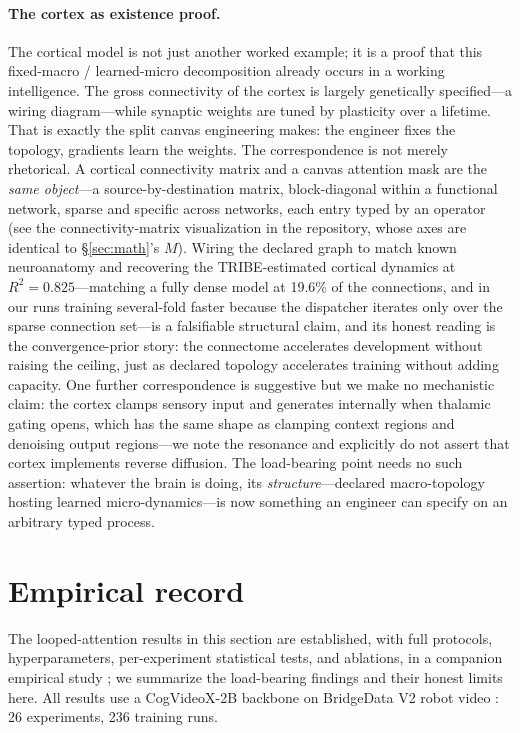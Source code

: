 \documentclass[10pt,twocolumn]{article}
\begin{document}
\paragraph{The cortex as existence proof.}
The cortical model is not just another worked example; it is a proof that this fixed-macro / learned-micro decomposition already occurs in a working intelligence. The gross connectivity of the cortex is largely genetically specified---a wiring diagram---while synaptic weights are tuned by plasticity over a lifetime. That is exactly the split canvas engineering makes: the engineer fixes the topology, gradients learn the weights. The correspondence is not merely rhetorical. A cortical connectivity matrix and a canvas attention mask are the \emph{same object}---a source-by-destination matrix, block-diagonal within a functional network, sparse and specific across networks, each entry typed by an operator (see the connectivity-matrix visualization in the repository, whose axes are identical to \S\ref{sec:math}'s $M$). Wiring the declared graph to match known neuroanatomy and recovering the TRIBE-estimated cortical dynamics at $R^2=0.825$---matching a fully dense model at 19.6\% of the connections, and in our runs training several-fold faster because the dispatcher iterates only over the sparse connection set---is a falsifiable structural claim, and its honest reading is the convergence-prior story: the connectome accelerates development without raising the ceiling, just as declared topology accelerates training without adding capacity. One further correspondence is suggestive but we make no mechanistic claim: the cortex clamps sensory input and generates internally when thalamic gating opens, which has the same shape as clamping context regions and denoising output regions---we note the resonance and explicitly do not assert that cortex implements reverse diffusion. The load-bearing point needs no such assertion: whatever the brain is doing, its \emph{structure}---declared macro-topology hosting learned micro-dynamics---is now something an engineer can specify on an arbitrary typed process.

\section{Empirical record}
\label{sec:results}

The looped-attention results in this section are established, with full protocols, hyperparameters, per-experiment statistical tests, and ablations, in a companion empirical study \cite{valdez2026looped}; we summarize the load-bearing findings and their honest limits here. All results use a CogVideoX-2B backbone \cite{yang2024cogvideox} on BridgeData V2 robot video \cite{walke2023bridgev2}: 26 experiments, 236 training runs.
\end{document}
